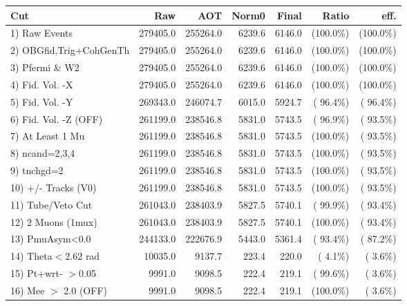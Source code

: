  \begin{table}[h!]\centering
 \begin{tabular}{||l||r|r|r|r|r|r||}
 \hline
 \hline
 Cut & Raw & AOT & Norm0 & Final & Ratio & eff.       \\
 \hline
  1) Raw Events           &     279405.0 &     255264.0 &       6239.6 &       6146.0 & (100.0\%) & (100.0\%) \\
  2) OBGfid,Trig+CohGenTh &     279405.0 &     255264.0 &       6239.6 &       6146.0 & (100.0\%) & (100.0\%) \\
  3) Pfermi \& W2         &     279405.0 &     255264.0 &       6239.6 &       6146.0 & (100.0\%) & (100.0\%) \\
  4) Fid. Vol. -X         &     279405.0 &     255264.0 &       6239.6 &       6146.0 & (100.0\%) & (100.0\%) \\
  5) Fid. Vol. -Y         &     269343.0 &     246074.7 &       6015.0 &       5924.7 & ( 96.4\%) & ( 96.4\%) \\
  6) Fid. Vol. -Z (OFF)   &     261199.0 &     238546.8 &       5831.0 &       5743.5 & ( 96.9\%) & ( 93.5\%) \\
  7) At Least 1 Mu        &     261199.0 &     238546.8 &       5831.0 &       5743.5 & (100.0\%) & ( 93.5\%) \\
  8) ncand=2,3,4          &     261199.0 &     238546.8 &       5831.0 &       5743.5 & (100.0\%) & ( 93.5\%) \\
  9) tnchgd=2             &     261199.0 &     238546.8 &       5831.0 &       5743.5 & (100.0\%) & ( 93.5\%) \\
 10) +/- Tracks (V0)      &     261199.0 &     238546.8 &       5831.0 &       5743.5 & (100.0\%) & ( 93.5\%) \\
 11) Tube/Veto Cut        &     261043.0 &     238403.9 &       5827.5 &       5740.1 & ( 99.9\%) & ( 93.4\%) \\
 12) 2 Muons (1mux)       &     261043.0 &     238403.9 &       5827.5 &       5740.1 & (100.0\%) & ( 93.4\%) \\
 13) PmuAsym<0.0          &     244133.0 &     222676.9 &       5443.0 &       5361.4 & ( 93.4\%) & ( 87.2\%) \\
 14) Theta$<$2.62 rad     &      10035.0 &       9137.7 &        223.4 &        220.0 & (  4.1\%) & (  3.6\%) \\
 15) Pt+wrt- $>$0.05      &       9991.0 &       9098.5 &        222.4 &        219.1 & ( 99.6\%) & (  3.6\%) \\
 16) Mee $>$ 2.0  (OFF)   &       9991.0 &       9098.5 &        222.4 &        219.1 & (100.0\%) & (  3.6\%) \\

\end{tabular}
\end{table}
